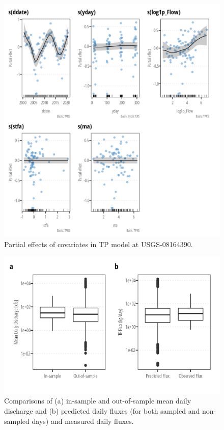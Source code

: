\documentclass[
]{article}
\begin{document}
\begin{figure}[h]

{\centering \includegraphics{model_assessment_files/figure-pdf/unnamed-chunk-23-1.png}

}

\caption{Partial effects of covariates in TP model at USGS-08164390.}

\end{figure}

\begin{figure}[h]

{\centering \includegraphics{model_assessment_files/figure-pdf/unnamed-chunk-24-1.png}

}

\caption{Comparisons of (a) in-sample and out-of-sample mean daily
discharge and (b) predicted daily fluxes (for both sampled and
non-sampled days) and measured daily fluxes.}

\end{figure}
\end{document}
